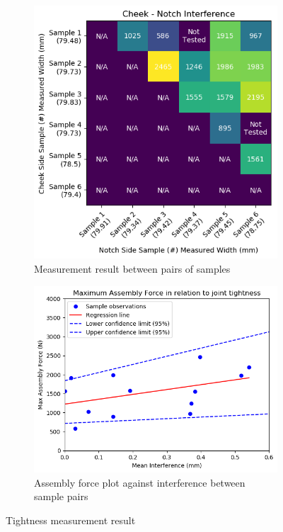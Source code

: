 \begin{figure}[H]
    \centering
    \begin{subfigure}[b]{0.40\textwidth}
        \centering
        \includegraphics[width=\textwidth]{images/04-1+2/tightness-pairwise-result.png}
        \caption{Measurement result between pairs of samples}
        \label{fig:tightness-measurement-pairwise}
    \end{subfigure}
    \hfill
    \begin{subfigure}[b]{0.58\textwidth}
        \centering
        \includegraphics[width=\textwidth]{images/04-1+2/tightness-result-plot.png}
        \caption{Assembly force plot against interference between sample pairs}
        \label{fig:tightness-measurement-plot}
    \end{subfigure}
    \caption{Tightness measurement result}
    \label{fig:tightness-measurement-result}
\end{figure}

